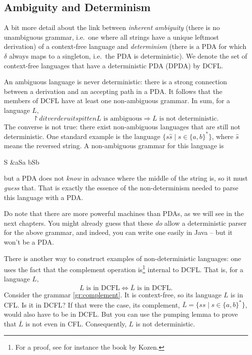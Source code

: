 \subsection{Ambiguity and Determinism}

A bit more detail about the link between \emph{inherent ambiguity} (there is no unambiguous grammar, i.e.\ one where all strings have a unique leftmost derivation) of a
context-free language and \emph{determinism} (there is a PDA for which $\delta$ always maps to a singleton, i.e.\ the PDA is deterministic). We denote the set of context-free languages that have a deterministic PDA (DPDA) by DCFL.

An ambiguous language is never deterministic: there is a strong
connection between a derivation and an accepting path in a PDA. It
follows that the members of DCFL have at least one non-ambiguous grammar.
In sum, for a language $L$,
\begin{equation*}\project{dit verder uitspitten}
	\text{$L$ is ambiguous} \Rightarrow \text{$L$ is not deterministic}.
\end{equation*}
The converse is not true: there exist non-ambiguous languages that are still not deterministic. One standard example is the language $\{ s\hat{s} \mid s \in
\{a,b\}^*\}$, where $\hat{s}$ means the reversed string. A non-ambiguous
grammar for this language is
\begin{grammar}
S &\rpijl aSa \mid bSb \mid \eps
\end{grammar}
but a PDA does not {\em know} in advance where the middle of the
string is, so it must {\em guess} that. That is exactly the essence of
the non-determinism needed to parse this language with a PDA. 

Do note that there are more powerful machines than PDAs, as we will see in the next
chapters. You might already guess that these \emph{do} allow a deterministic parser for the above grammar, and indeed, you can write one easily in Java -- but it won't be a PDA.

There is another way to construct examples of non-deterministic
languages: one uses the fact that the complement operation is\footnote{For a proof, see for instance the book by Kozen.} internal to DCFL. That is, for a language $L$,
\begin{equation*}
	\text{$L$ is in DCFL} \Leftrightarrow \text{$\overline L$ is in DCFL}.
\end{equation*}
Consider the grammar \ref{gr:complement}. It is context-free, so its language $L$ is in CFL. Is it in DCFL? If that were the case, its complement, $\overline L = \{ss\mid s \in \{a,b\}^*\}$, would also have to be in DCFL. But you can use the pumping lemma to prove that $\overline L$ is not even in CFL. Consequently, $L$ is not deterministic.

